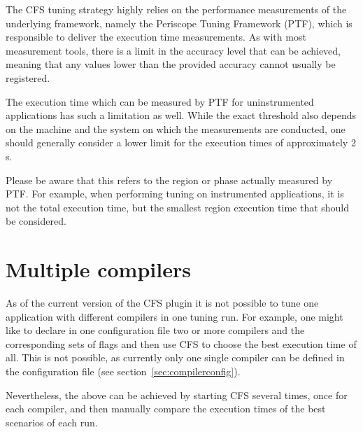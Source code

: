 \documentclass[11pt,a4paper, oneside]{book} %
\begin{document}
The CFS tuning strategy highly relies on the performance measurements of the underlying framework, namely the Periscope Tuning Framework (PTF), which is responsible to deliver the execution time measurements. As with most measurement tools, there is a limit in the accuracy level that can be achieved, meaning that any values lower than the provided accuracy cannot usually be registered.

The execution time which can be measured by PTF for uninstrumented applications has such a limitation as well. While the exact threshold also depends on the machine and the system on which the measurements are conducted, one should generally consider a lower limit for the execution times of approximately 2 s.

Please be aware that this refers to the region or phase actually measured by PTF. For example, when performing tuning on instrumented applications, it is not the total execution time, but the smallest region execution time that should be considered.


\section{Multiple compilers}\label{sec:limitationscompilers}

As of the current version of the CFS plugin it is not possible to tune one application with different compilers in one tuning run. For example, one might like to declare in one configuration file two or more compilers and the corresponding sets of flags and then use CFS to choose the best execution time of all. This is not possible, as currently only one single compiler can be defined in the configuration file (see section~\ref{sec:compilerconfig}).

Nevertheless, the above can be achieved by starting CFS several times, once for each compiler, and then manually compare the execution times of the best scenarios of each run.
\end{document}
